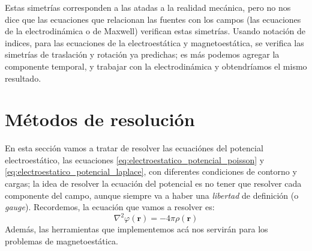 \documentclass[a4paper]{article}
\numberwithin{equation}{section} %
\renewcommand{\vec}[1]{\boldsymbol{#1}}
\begin{document}
Estas simetrías corresponden a las atadas a la realidad mecánica, pero no nos dice que las ecuaciones que relacionan las fuentes con los campos (las ecuaciones de la electrodinámica o de Maxwell) verifican estas simetrías. Usando notación de indices, %
para las ecuaciones de la electroestática y magnetoestática, se verifica las simetrías de traslación y rotación ya predichas; es más podemos agregar la componente temporal, y trabajar con la electrodinámica y obtendríamos el mismo resultado.

\section{Métodos de resolución}
En esta sección vamos a tratar de resolver las ecuaciónes del potencial electroestático, las ecuaciones \ref{eq:electroestatico_potencial_poisson} y \ref{eq:electroestatico_potencial_laplace}, con diferentes condiciones de contorno y cargas; la idea de resolver la ecuación del potencial es no tener que resolver cada componente del campo, aunque siempre va a haber una \emph{libertad} de definición (o \emph{gauge}). Recordemos, la ecuación que vamos a resolver es:
\[ \nabla^2 \varphi(\vec{r}) = - 4 \pi \rho(\vec{r}) \]
Además, las herramientas que implementemos acá nos servirán para los problemas de magnetoestática.
\end{document}
